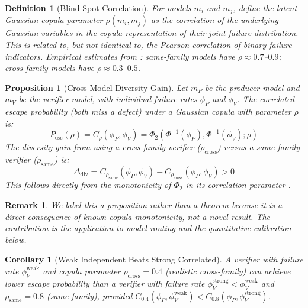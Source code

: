 \documentclass[11pt, a4paper, logo, copyright]{googledeepmind}
\newtheorem{definition}{Definition}[section]
\newtheorem{proposition}{Proposition}[section]
\newtheorem{corollary}{Corollary}[section]
\newtheorem*{remark}{Remark}
\begin{document}
\begin{definition}[Blind-Spot Correlation]
For models $m_i$ and $m_j$, define the latent Gaussian copula parameter $\rho(m_i, m_j)$ as the correlation of the underlying Gaussian variables in the copula representation of their joint failure distribution. This is related to, but not identical to, the Pearson correlation of binary failure indicators. Empirical estimates from \citet{correlatedensemble2026}: same-family models have $\rho \approx 0.7$--$0.9$; cross-family models have $\rho \approx 0.3$--$0.5$.
\end{definition}

\begin{proposition}[Cross-Model Diversity Gain]
\label{prop:diversity}
Let $m_P$ be the producer model and $m_V$ be the verifier model, with individual failure rates $\phi_P$ and $\phi_V$. The correlated escape probability (both miss a defect) under a Gaussian copula \citep{sklar1959} with parameter $\rho$ is:
\begin{equation}
P_{\mathrm{esc}}(\rho) = C_\rho(\phi_P, \phi_V) = \Phi_2(\Phi^{-1}(\phi_P), \Phi^{-1}(\phi_V); \rho)
\end{equation}
The diversity gain from using a cross-family verifier ($\rho_{\mathrm{cross}}$) versus a same-family verifier ($\rho_{\mathrm{same}}$) is:
\begin{equation}
\Delta_{\mathrm{div}} = C_{\rho_{\mathrm{same}}}(\phi_P, \phi_V) - C_{\rho_{\mathrm{cross}}}(\phi_P, \phi_V) > 0
\end{equation}
This follows directly from the monotonicity of $\Phi_2$ in its correlation parameter \citep{nelsen2006copulas}.
\end{proposition}

\begin{remark}
We label this a proposition rather than a theorem because it is a direct consequence of known copula monotonicity, not a novel result. The contribution is the application to model routing and the quantitative calibration below.
\end{remark}

\begin{corollary}[Weak Independent Beats Strong Correlated]
\label{cor:weakbeats}
A verifier with failure rate $\phi_V^{\mathrm{weak}}$ and copula parameter $\rho_{\mathrm{cross}} = 0.4$ (realistic cross-family) can achieve lower escape probability than a verifier with failure rate $\phi_V^{\mathrm{strong}} < \phi_V^{\mathrm{weak}}$ and $\rho_{\mathrm{same}} = 0.8$ (same-family), provided $C_{0.4}(\phi_P, \phi_V^{\mathrm{weak}}) < C_{0.8}(\phi_P, \phi_V^{\mathrm{strong}})$.
\end{corollary}
\end{document}
